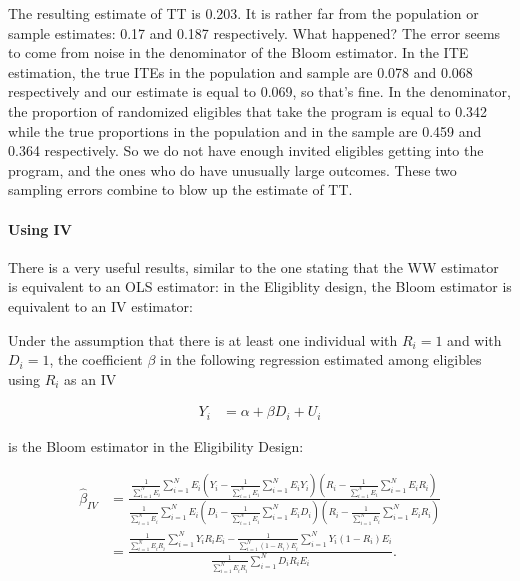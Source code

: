\documentclass[]{book}
\let\oldparagraph\paragraph
\renewcommand{\paragraph}[1]{\oldparagraph{#1}\mbox{}}
\theoremstyle{definition}
\theoremstyle{definition}
\theoremstyle{definition}
\theoremstyle{remark}
\let\BeginKnitrBlock\begin \let\EndKnitrBlock\end
\begin{document}
The resulting estimate of TT is 0.203.
It is rather far from the population or sample estimates: 0.17 and 0.187 respectively.
What happened?
The error seems to come from noise in the denominator of the Bloom estimator.
In the ITE estimation, the true ITEs in the population and sample are 0.078 and 0.068 respectively and our estimate is equal to 0.069, so that's fine.
In the denominator, the proportion of randomized eligibles that take the program is equal to 0.342 while the true proportions in the population and in the sample are 0.459 and 0.364 respectively.
So we do not have enough invited eligibles getting into the program, and the ones who do have unusually large outcomes.
These two sampling errors combine to blow up the estimate of TT.

\hypertarget{using-iv}{%
\paragraph{Using IV}\label{using-iv}}

There is a very useful results, similar to the one stating that the WW estimator is equivalent to an OLS estimator: in the Eligiblity design, the Bloom estimator is equivalent to an IV estimator:

\BeginKnitrBlock{theorem}[Bloom is IV]
\protect\hypertarget{thm:BloomIV}{}{\label{thm:BloomIV} \iffalse (Bloom is IV) \fi{} }Under the assumption that there is at least one individual with \(R_i=1\) and with \(D_i=1\), the coefficient \(\beta\) in the following regression estimated among eligibles using \(R_i\) as an IV

\begin{align*}
        Y_i &  = \alpha + \beta D_i + U_i
    \end{align*}

is the Bloom estimator in the Eligibility Design:

\begin{align*}
\hat{\beta}_{IV} & = \frac{\frac{1}{\sum_{i=1}^N E_i}\sum_{i=1}^NE_i\left(Y_i-\frac{1}{\sum_{i=1}^N E_i}\sum_{i=1}^NE_iY_i\right)\left(R_i-\frac{1}{\sum_{i=1}^N E_i}\sum_{i=1}^NE_iR_i\right)}{\frac{1}{\sum_{i=1}^N E_i}\sum_{i=1}^NE_i\left(D_i-\frac{1}{\sum_{i=1}^N E_i}\sum_{i=1}^NE_iD_i\right)\left(R_i-\frac{1}{\sum_{i=1}^N E_i}\sum_{i=1}^NE_iR_i\right)} \\
                                & = \frac{\frac{1}{\sum_{i=1}^N E_iR_i}\sum_{i=1}^N Y_iR_iE_i-\frac{1}{\sum_{i=1}^N (1-R_i)E_i}\sum_{i=1}^N Y_i(1-R_i)E_i}{\frac{1}{\sum_{i=1}^N E_iR_i}\sum_{i=1}^N D_iR_iE_i}.
\end{align*}
\EndKnitrBlock{theorem}
\end{document}
